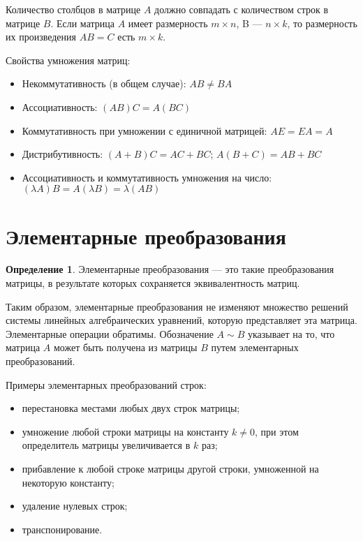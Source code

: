 \documentclass[a4paper,12pt]{extbook}
\theoremstyle{definition}
\newtheorem{definition}{Определение}[section]
\begin{document}
Количество столбцов в матрице \(A\) должно совпадать с количеством строк в матрице \(B\). Если матрица \(A\) имеет размерность \(m \times n\), B — \(n \times k\), то размерность их произведения \(AB = C\) есть \(m \times k\).

Свойства умножения матриц:
\begin{itemize}
    \item Некоммутативность (в общем случае): \(AB \neq BA\)
    \item Ассоциативность: \((AB)C = A(BC)\)
    \item Коммутативность при умножении с единичной матрицей: \(AE = EA = A\)
    \item Дистрибутивность: \((A + B) C = AC + BC\); \quad \(A (B + C) = AB + BC\)
    \item Ассоциативность и коммутативность умножения на число: \((\lambda A) B = A (\lambda B) = \lambda (AB)\)
\end{itemize}

\section{Элементарные преобразования}
\label{sec:org11b71ac}
\begin{definition}
    Элементарные преобразования — это такие преобразования матрицы, в результате которых сохраняется эквивалентность матриц.
\end{definition}

Таким образом, элементарные преобразования не изменяют множество решений системы линейных алгебраических уравнений, которую представляет эта матрица. Элементарные операции обратимы. Обозначение \(A \sim B\) указывает на то, что матрица \(A\) может быть получена из матрицы \(B\) путем элементарных преобразований.

Примеры элементарных преобразований строк:
\begin{itemize}
    \item перестановка местами любых двух строк матрицы;
    \item умножение любой строки матрицы на константу \(k \neq 0\), при этом определитель матрицы увеличивается в \(k\) раз;
    \item прибавление к любой строке матрицы другой строки, умноженной на некоторую константу;
    \item удаление нулевых строк;
    \item транспонирование.
\end{itemize}
\end{document}
